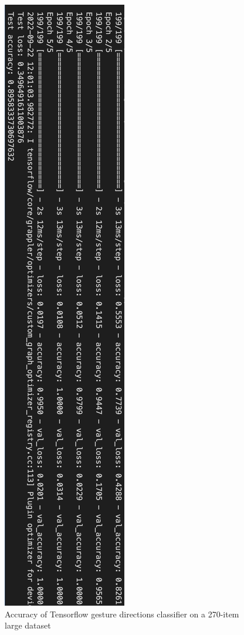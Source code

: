 \begin{figure}[h]
    \centering
    \includegraphics[width=0.7\linewidth]{figures/tf_directions_accuracy.png}
    \caption{Accuracy of Tensorflow gesture directions classifier on a 270-item large dataset }
    \label{fig:tf_directions_accuracy}
\end{figure}

